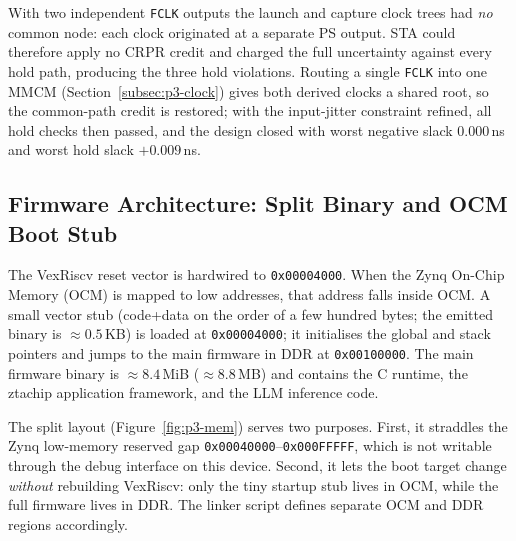 With two independent \texttt{FCLK} outputs the launch and capture clock trees had \emph{no} common
node: each clock originated at a separate PS output. STA could therefore apply no CRPR credit and
charged the full uncertainty against every hold path, producing the three hold violations. Routing a
single \texttt{FCLK} into one MMCM (Section~\ref{subsec:p3-clock}) gives both derived clocks a shared
root, so the common-path credit is restored; with the input-jitter constraint refined, all hold
checks then passed, and the design closed with worst negative slack $0.000$\,ns and worst hold slack
$+0.009$\,ns.





\subsection{Firmware Architecture: Split Binary and OCM Boot Stub}

The VexRiscv reset vector is hardwired to \texttt{0x00004000}. When the Zynq On-Chip Memory (OCM) is
mapped to low addresses, that address falls inside OCM. A small vector stub
(code+data on the order of a few hundred bytes; the emitted binary is $\approx 0.5$\,KB) is loaded at
\texttt{0x00004000}; it initialises the global and stack pointers and jumps to the main firmware in
DDR at \texttt{0x00100000}. The main firmware binary is $\approx 8.4$\,MiB ($\approx 8.8$\,MB) and
contains the C runtime, the ztachip application framework, and the LLM inference code.

The split layout (Figure~\ref{fig:p3-mem}) serves two purposes. First, it straddles the Zynq
low-memory reserved gap \texttt{0x00040000}--\texttt{0x000FFFFF}, which is not writable through the
debug interface on this device. Second, it lets the boot target change \emph{without} rebuilding
VexRiscv: only the tiny startup stub lives in OCM, while the full firmware lives in DDR. The linker
script defines separate OCM and DDR regions accordingly.

